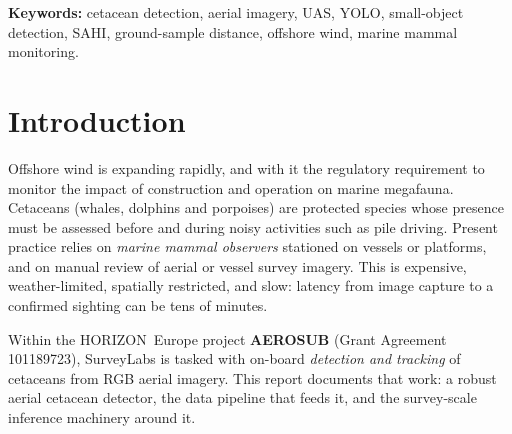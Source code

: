 \documentclass[11pt,a4paper]{article}
\begin{document}
\begin{abstract}
illustration on a real $151$-megapixel survey frame, plain whole-frame inference
detects \emph{none} of three resolvable dolphins whereas adaptive SAHI recovers
all three with zero false positives at $17\times$ fewer tiles than the best fixed
slice; a semi-synthetic altitude sweep shows the same policy holding recall
comparable to fixed slicing while spending tiles only as geometry demands.
Finally we quantify the practical limit of the low-GSD end: on out-of-domain
survey frames the detector plateaus near $0.6$ recall at $2$ false positives per
image --- useful triage, but a real domain gap that further in-domain
pseudo-labelling is designed to close. The
model, data pipeline and inference tooling form the basis of AEROSUB
deliverable D2.1 and key exploitable result KER9.
\end{abstract}

\noindent\textbf{Keywords:} cetacean detection, aerial imagery, UAS, YOLO,
small-object detection, SAHI, ground-sample distance, offshore wind, marine
mammal monitoring.

\section{Introduction}
Offshore wind is expanding rapidly, and with it the regulatory requirement to
monitor the impact of construction and operation on marine megafauna.
Cetaceans (whales, dolphins and porpoises) are protected species whose presence
must be assessed before and during noisy activities such as pile driving.
Present practice relies on \emph{marine mammal observers} stationed on vessels
or platforms, and on manual review of aerial or vessel survey imagery. This is
expensive, weather-limited, spatially restricted, and slow: latency from image
capture to a confirmed sighting can be tens of minutes.

Within the HORIZON~Europe project \textbf{AEROSUB} (Grant Agreement
101189723), SurveyLabs is tasked with on-board \emph{detection and tracking} of
cetaceans from RGB aerial imagery. This report documents that work: a robust
aerial cetacean detector, the data pipeline that feeds it, and the survey-scale
inference machinery around it.
\end{document}
